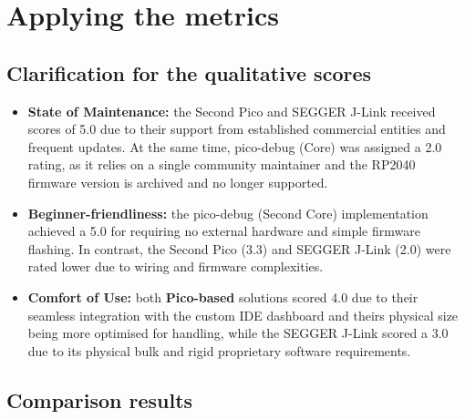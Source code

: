 \section{Applying the metrics}

\subsection{Clarification for the qualitative scores}

\begin{itemize}
    \item \textbf{State of Maintenance:} the Second Pico and SEGGER J-Link received scores of 5.0 due to their support from established commercial entities and frequent updates. At the same time, pico-debug (Core) was assigned a 2.0 rating, as it relies on a single community maintainer and the RP2040 firmware version is archived and no longer supported.
    \item \textbf{Beginner-friendliness:} the pico-debug (Second Core) implementation achieved a 5.0 for requiring no external hardware and simple firmware flashing. In contrast, the Second Pico (3.3) and SEGGER J-Link (2.0) were rated lower due to wiring and firmware complexities.
    \item \textbf{Comfort of Use:} both \textbf{Pico-based} solutions scored 4.0 due to their seamless integration with the custom IDE dashboard and theirs physical size being more optimised for handling, while the SEGGER J-Link scored a 3.0 due to its physical bulk and rigid proprietary software requirements.

\end{itemize}

\subsection{Comparison results}

